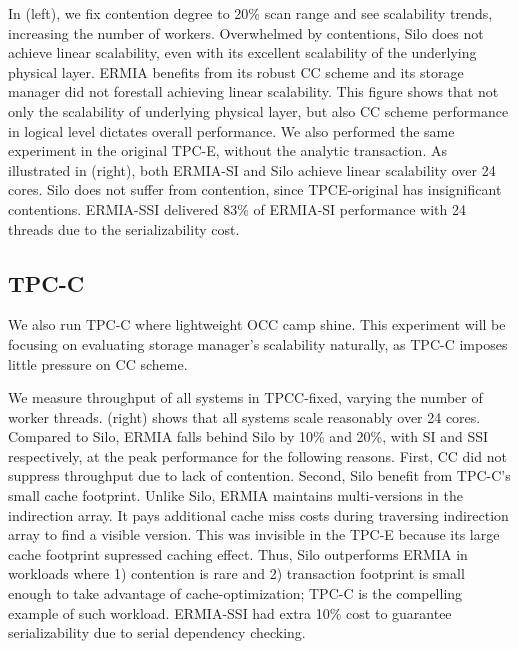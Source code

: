 In  (left), we fix contention degree to 20\% scan range and see scalability trends, increasing the number of workers. Overwhelmed by contentions, Silo does not achieve linear scalability, even with its excellent scalability of the underlying physical layer. ERMIA benefits from its robust CC scheme and its storage manager did not forestall achieving linear scalability. This figure shows that not only the scalability of underlying physical layer, but also CC scheme performance in logical level dictates overall performance. We also performed the same experiment in the original TPC-E, without the analytic transaction. As illustrated in  (right), both ERMIA-SI and Silo achieve linear scalability over 24 cores. Silo does not suffer from contention, since TPCE-original has insignificant contentions. ERMIA-SSI delivered 83\% of ERMIA-SI performance with 24 threads due to the serializability cost.

\subsection{TPC-C} 
We also run TPC-C where lightweight OCC camp shine. This experiment will be focusing on evaluating storage manager's scalability naturally, as TPC-C imposes little pressure on CC scheme. 

We measure throughput of all systems in TPCC-fixed, varying the number of worker threads.  (right) shows that all systems scale reasonably over 24 cores. Compared to Silo, ERMIA falls behind Silo by 10\% and 20\%, with SI and SSI respectively, at the peak performance for the following reasons. First, CC did not suppress throughput due to lack of contention. Second, Silo benefit from TPC-C's small cache footprint. Unlike Silo, ERMIA maintains multi-versions in the indirection array. It pays additional cache miss costs during traversing indirection array to find a visible version. This was invisible in the TPC-E because its large cache footprint supressed caching effect.  Thus, Silo outperforms ERMIA in workloads where 1) contention is rare and 2) transaction footprint is small enough to take advantage of cache-optimization; TPC-C is the compelling example of such workload. ERMIA-SSI had extra 10\% cost to guarantee serializability due to serial dependency checking.

